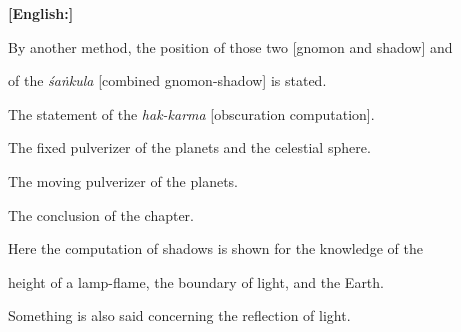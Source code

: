 \documentclass[10pt,a4paper]{article}
\begin{document}
\begin{minipage}[t]{0.47\textwidth}


\end{minipage}%

\hfill\vline\hfill%

\begin{minipage}[t]{0.47\textwidth}

\textbf{[English:]}

By another method, the position of those two [gnomon and shadow] and

of the \textit{śaṅkula} [combined gnomon-shadow] is stated.



The statement of the \textit{hak-karma} [obscuration computation].

The fixed pulverizer of the planets and the celestial sphere.

The moving pulverizer of the planets.

The conclusion of the chapter.



Here the computation of shadows is shown for the knowledge of the

height of a lamp-flame, the boundary of light, and the Earth.

Something is also said concerning the reflection of light.

\end{minipage}



\vspace{1.5em}
\end{document}
